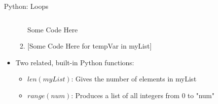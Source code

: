 \documentclass[10pt, aspectratio=169]{beamer}
\begin{document}
\begin{frame}{Python: Loops}
\begin{columns}
\begin{column}{0.5\textwidth}
\begin{itemize}
\begin{enumerate}
                    \hspace{0.25cm} Some Code Here

                    \item $[$Some Code Here for tempVar in myList$]$
                \end{enumerate}
                \item Two related, built-in Python functions:
                \begin{itemize}
                    \item $len(myList)$: Gives the number of elements in myList
                    \item $range(num)$: Produces a list of all integers from 0 to "num"
                \end{itemize}
            \end{itemize}
        \end{column}
    \end{columns}
\end{frame}
\end{document}
